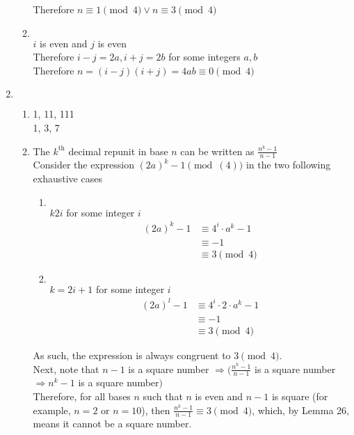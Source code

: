 \documentclass{article}
\newcommand{\case}[1]{\item [\textbf{C#1}:]$ $ \\}
\begin{document}
\begin{enumerate}
\begin{enumerate}
                Therefore $n\equiv 1 \pmod{4} \lor n\equiv 3\pmod{4}$
            \case{2} $i$ is even and $j$ is even \\
                Therefore $i-j = 2a, i+j = 2b$ for some integers $a, b$ \\
                Therefore $n=(i-j)(i+j)=4ab\equiv 0 \pmod{4}$
        \end{enumerate}
    \item $ $
        \begin{enumerate}
            \item 1, 11, 111\\
                1, 3, 7
            \item The $k^{\textrm{th}}$ decimal repunit in base $n$ can be written as $\frac{n^k-1}{n-1}$ \\
                Consider the expression $(2a)^k -1 \pmod(4)$ in the two following exhaustive cases
                \begin{enumerate}
                    \case{0} $k2i$ for some integer $i$ \\
                        \begin{align*}
                            (2a)^k -1 &\equiv 4^i\cdot a^k - 1 \\
                            &\equiv -1 \\
                            &\equiv 3 \pmod{4}
                        \end{align*}
                    \case{1} $k=2i+1$ for some integer $i$ \\
                        \begin{align*}
                            (2a)^l -1 &\equiv 4^i\cdot 2\cdot a^k -1 \\
                            &\equiv -1 \\
                            &\equiv 3 \pmod{4}
                        \end{align*}
                \end{enumerate}
                As such, the expression is always congruent to $3 \pmod{4}$. \\
                Next, note that $n-1$ is a square number $\Rightarrow (\frac{n^k -1}{n-1}$ is a square number $\Rightarrow n^k-1$ is a square number$)$ \\
                Therefore, for all bases $n$ such that $n$ is even and $n-1$ is square (for example, $n=2$ or $n=10$), then $\frac{n^k-1}{n-1}\equiv 3 \pmod{4}$, which, by Lemma 26, means it cannot be a square number.
        \end{enumerate}
        
    \end{enumerate}
\end{document}
